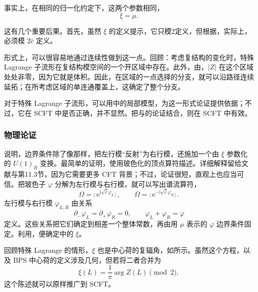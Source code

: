 事实上，在相同的归一化约定下，这两个参数相同，
\begin{equation}\label{eq:5.65}
\xi=\mu.
\end{equation}

这有几个重要后果。首先，虽然 $\xi$ 的定义提示，它只模2定义，但根据，实际上，必须模 $2\hat c$ 定义。

形式上，可以很容易地通过连续性做到这一点。回顾：考虑复结构的变化时，特殊 Lagrange 子流形在复结构模空间的一个开区域中存在。此外，由，$|Z|$ 在这个区域处处非零，因为它就是体积。因此，在区域的一点选择的分支，就可以沿路径连续延拓；在所考虑区域的单连通覆盖上，这确定了整个分支。

对于特殊 Lagrange 子流形，可以用中的局部模型，为这一形式论证提供依据；不过，它在 SCFT 中是否正确，并不显然。把与的论证结合，则在 SCFT 中有效。

\subsubsection{物理论证}\label{sec:5.3.5.1}

说明，边界条件除了像那样，把左行模“反射”为右行模，还施加一个由 $\xi$ 参数化的 $U(1)_R$ 变换。最简单的证明，使用玻色化的顶点算符描述。详细解释留给文献与第11.3节，因为它需要更多 CFT 背景；不过，论证很短，直观上也应当可信。把玻色子 $\varphi$ 分解为左行模与右行模，就可以写出谱流算符，
\begin{equation}\label{eq:5.66}
\Omega={:}\mathrm{e}^{\mathrm{i}\sqrt{\hat c}\varphi_L}{:},\qquad
\overline\Omega={:}\mathrm{e}^{-\mathrm{i}\sqrt{\hat c}\varphi_R}{:}.
\end{equation}
左行模与右行模 $\varphi_{L,R}$ 由关系
\[
\partial_-\varphi_L=\partial_+\varphi_R=0,\qquad
\varphi_L+\varphi_R=\varphi
\]
定义。这些关系把它们确定到相差一个整体常数，再由用 $\mu$ 表示的 $\varphi$ 边界条件固定。利用，便确定中的 $\xi$。

回顾特殊 Lagrange 的情形，$\xi$ 也是中心荷的复辐角，如所示。虽然这个方程，以及 BPS 中心荷的定义涉及几何，但若将二者合并为
\begin{equation}\label{eq:5.67}
\xi(L)=\frac{1}{\pi}\arg Z(L)\pmod2,
\end{equation}
这个陈述就可以原样推广到 SCFT。

